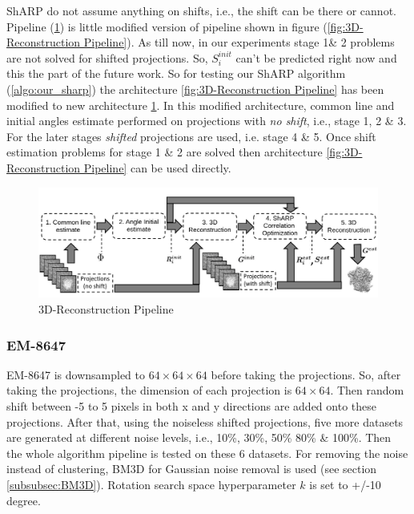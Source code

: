 \documentclass[twoside]{iitbreport}
\begin{document}
ShARP do not assume anything on shifts, i.e., the shift can be there or cannot.  Pipeline (\ref{fig:3D-Reconstruction Pipeline-Sharp}) is  little modified version of pipeline shown in figure (\ref{fig:3D-Reconstruction Pipeline}). As till now, in our experiments stage 1\&  2 problems are not solved for shifted projections. So,  $S_i^{init}$ can't be predicted right now and this the part of the future work. So for testing our ShARP algorithm (\ref{algo:our_sharp}) the architecture \ref{fig:3D-Reconstruction Pipeline} has been modified to new architecture \ref{fig:3D-Reconstruction Pipeline-Sharp}. In this modified architecture, common line and initial angles estimate performed on projections with \textit{no shift}, i.e., stage 1, 2 \& 3. For the later stages \textit{shifted} projections are used, i.e. stage 4 \& 5. Once shift estimation problems for stage 1 \& 2 are solved then architecture \ref{fig:3D-Reconstruction Pipeline} can be used directly.

\begin{figure}[H]
\includegraphics[width=1\textwidth]{3d-reconstrction-pipepline-Sharp.png}
\centering
\captionsetup{justification=centering}
\caption{3D-Reconstruction Pipeline }
\label{fig:3D-Reconstruction Pipeline-Sharp}
\end{figure}

\subsubsection{\textbf{EM-8647}}
EM-8647 is downsampled to $64\times64\times64$ before taking the projections. So, after taking the projections, the dimension of each projection is $64\times64$. Then random shift between -5 to 5 pixels in both x and y directions are added onto these projections. After that, using the noiseless shifted projections, five more datasets are generated at different noise levels, i.e., 10\%, 30\%, 50\% 80\% \& 100\%. Then the whole algorithm pipeline is tested on these 6 datasets. For removing the noise instead of clustering, BM3D for Gaussian noise removal is used (see section \ref{subsubsec:BM3D}). Rotation search space hyperparameter $k$ is set to +/-10 degree.
\end{document}
